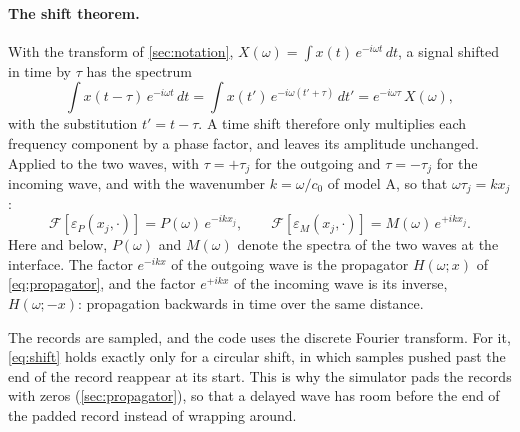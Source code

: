 \documentclass[11pt,a4paper,numbers=noenddot,abstract=true]{scrartcl}
\begin{document}
\paragraph{The shift theorem.} With the transform of \cref{sec:notation},
$X(\omega) = \int x(t)\, e^{-i\omega t}\, dt$, a signal shifted in time by $\tau$ has the spectrum
\begin{equation}
  \int x(t - \tau)\, e^{-i\omega t}\, dt
  = \int x(t')\, e^{-i\omega (t' + \tau)}\, dt'
  = e^{-i\omega\tau}\, X(\omega),
  \label{eq:shift}
\end{equation}
with the substitution $t' = t - \tau$. A time shift therefore only multiplies each frequency component by a phase
factor, and leaves its amplitude unchanged. Applied to the two waves, with $\tau = +\tau_j$ for the outgoing and
$\tau = -\tau_j$ for the incoming wave, and with the wavenumber $k = \omega / c_0$ of model A, so that
$\omega\tau_j = k x_j$:
\begin{equation}
  \mathcal{F}[\varepsilon_P(x_j, \cdot)] = P(\omega)\, e^{-ikx_j}, \qquad
  \mathcal{F}[\varepsilon_M(x_j, \cdot)] = M(\omega)\, e^{+ikx_j}.
  \label{eq:shiftwaves}
\end{equation}
Here and below, $P(\omega)$ and $M(\omega)$ denote the spectra of the two waves at the interface. The factor
$e^{-ikx}$ of the outgoing wave is the propagator $H(\omega; x)$ of \cref{eq:propagator}, and the factor
$e^{+ikx}$ of the incoming wave is its inverse, $H(\omega; -x)$: propagation backwards in time over the same
distance.

The records are sampled, and the code uses the discrete Fourier transform. For it, \cref{eq:shift} holds exactly
only for a circular shift, in which samples pushed past the end of the record reappear at its start. This is why
the simulator pads the records with zeros (\cref{sec:propagator}), so that a delayed wave has room before the end
of the padded record instead of wrapping around.
\end{document}
